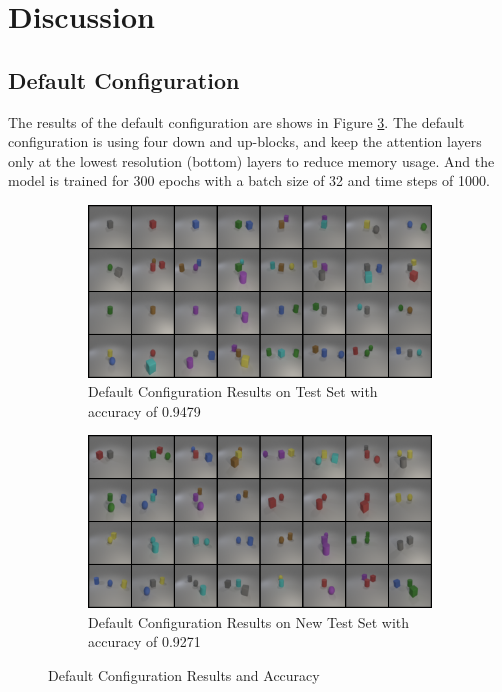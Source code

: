 \section{Discussion}

\subsection{Default Configuration}

The results of the default configuration are shows in Figure \ref{fig:default}.
The default configuration is using four down and up-blocks, and keep the attention layers only at the lowest resolution (bottom) layers to reduce memory usage.
And the model is trained for 300 epochs with a batch size of 32 and time steps of 1000.

\begin{figure}[H]
    \centering
    \begin{subfigure}{0.48\textwidth}
        \centering
        \includegraphics[width=\textwidth]{figures/default_test.png}
        \caption{Default Configuration Results on Test Set with accuracy of 0.9479}
        \label{fig:default_test}
    \end{subfigure}
    \hfill
    \begin{subfigure}{0.48\textwidth}
        \centering
        \includegraphics[width=\textwidth]{figures/default_new_test.png}
        \caption{Default Configuration Results on New Test Set with accuracy of 0.9271}
        \label{fig:default_new_test}
    \end{subfigure}
    \caption{Default Configuration Results and Accuracy}
    \label{fig:default}
\end{figure}

